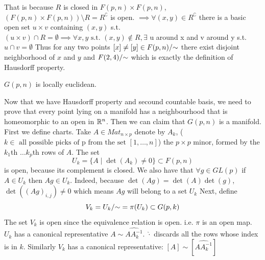 \documentclass[11pt,a4paper]{report}
\begin{document}
That is because $R$ is closed in $F(p,n) \times F(p,n)$, $(F(p,n) \times F(p,n)) \setminus R = R^{\complement}$ is open.
$\implies \forall (x,y) \in R^{\complement} $ there is a basic open set $u \times v$ containing $(x,y)$ s.t. $ (u \times v) \cap R = \emptyset 
\implies \forall x, y \text{ s.t. } (x,y) \not\in R, \exists$ u around x and v around y s.t. $u \cap v = \emptyset$
Thus for any two points $[x] \neq [y] \in F(p,n)/{\sim}$ there exist disjoint neighborhood of $x$ and $y$ and $ F(2,4)/{\sim}$ which is exactly the definition of Hausdorff property.
\newline
\begin{Prop}
   $G(p,n)$ is locally euclidean. 
\end{Prop}
Now that we have Hausdorff property and secound countable basis, we need to prove that every point lying on a manifold has a neighbourhood that is homeomorphic to an open in $\mathbb{R}^n$.
Then we can claim that $G(p,n)$ is a manifold.
\newline
First we define charts. Take $A \in Mat_{n \times p} $ denote by $A_{k}$, ($ k \in \text{ all possible picks of p from the set } [1, \dots , n] $) the $p \times p$ minor, formed by the $k_1$th $\dots k_p$th rows of $A$.
The set
$$ U_{k} = \{ A \; | \; \det(A_{k}) \neq 0 \} \subset F(p,n)$$ is open, because its complement is closed. 
We also have that $\forall g \in GL(p)$ if $A \in U_{k}$ then $ Ag \in U_{k}$. 
Indeed, because $\det(Ag) = \det(A) \det(g)$, $\det( (Ag)_{i,j}) \neq 0$ which means $Ag$  will belong to a set $U_{k}$ 
Next, define
$$V_{k} = U_{k}/{\sim} = \pi (U_{k}) \subset G(p,k)$$
The set $V_{k}$ is open since the equivalence relation is open. i.e. $\pi$ is an open map.
\newline
$U_k$ has a canonical representative $A \sim \widehat{A A_{k}^{-1}}$. $\widehat{\cdot}$ discards all the rows whose index is in $k$.
Similarly $V_k$ has a canonical representative: $[A] \sim [\widehat{A A_{k}^{-1}}] $
\end{document}
